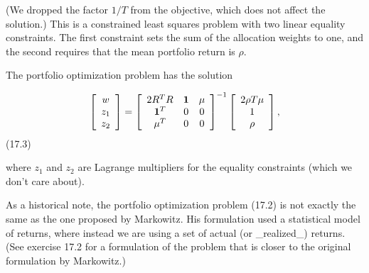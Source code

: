 (We dropped the factor \(1/T\) from the objective, which does not affect the solution.) This is a constrained least squares problem with two linear equality constraints. The first constraint sets the sum of the allocation weights to one, and the second requires that the mean portfolio return is \(\rho\).

The portfolio optimization problem has the solution

\[\left[\begin{array}{c}w\\ z_{1}\\ z_{2}\end{array}\right]=\left[\begin{array}{ccc}2R^{T}R&{\bf 1}&\mu\\ {\bf 1}^{T}&0&0\\ \mu^{T}&0&0\end{array}\right]^{-1}\left[\begin{array}{c}2\rho T\mu\\ 1\\ \rho\end{array}\right],\] (17.3)

where \(z_{1}\) and \(z_{2}\) are Lagrange multipliers for the equality constraints (which we don't care about).

As a historical note, the portfolio optimization problem (17.2) is not exactly the same as the one proposed by Markowitz. His formulation used a statistical model of returns, where instead we are using a set of actual (or _realized_) returns. (See exercise 17.2 for a formulation of the problem that is closer to the original formulation by Markowitz.)